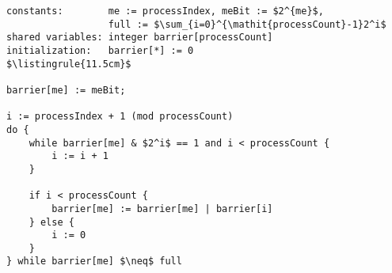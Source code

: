 \begin{minipage}
\centering
\begin{lstlisting}[mathescape, linewidth=11.5cm]
constants:        me := processIndex, meBit := $2^{me}$,
                  full := $\sum_{i=0}^{\mathit{processCount}-1}2^i$
shared variables: integer barrier[processCount]
initialization:   barrier[*] := 0
$\listingrule{11.5cm}$

barrier[me] := meBit;

i := processIndex + 1 (mod processCount)
do {
	while barrier[me] & $2^i$ == 1 and i < processCount {
		i := i + 1
	}

	if i < processCount {
		barrier[me] := barrier[me] | barrier[i]
	} else {
		i := 0
	}
} while barrier[me] $\neq$ full
\end{lstlisting}
\end{minipage}

